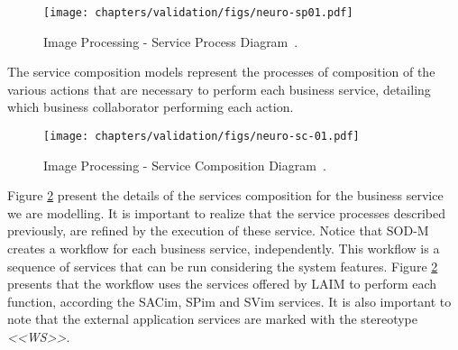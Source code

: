 \begin{figure}[ht!]
\centering
\texttt{[image: chapters/validation/figs/neuro-sp01.pdf]}
\caption{Image Processing - Service Process Diagram~\cite{valeriaThesis}.}
\label{fig:sp-imageProcessing}
\end{figure}




% 


The service composition models represent the processes of composition of the
various actions that are necessary to perform each business service, detailing
which business collaborator performing each action. 

 
 \begin{figure}[ht!]
\centering
\texttt{[image: chapters/validation/figs/neuro-sc-01.pdf]}
\caption{Image Processing - Service Composition Diagram~\cite{valeriaThesis}.}
\label{fig:sc-imageProcessing}
\end{figure}

% 

Figure \ref{fig:sc-imageProcessing} present the details of the services composition
for the business service we are modelling. It is important to realize that the
service processes described previously, are refined by the execution of these service.
Notice that SOD-M creates a workflow for each business service, independently.
This workflow is a sequence of services that can be run
considering the system features. Figure
\ref{fig:sc-imageProcessing} presents that the workflow
uses the services offered by LAIM to perform each function, according the SACim, SPim and SVim
services. It is also important to note that the external
application services are marked with the stereotype \textit{<<WS>>}.

